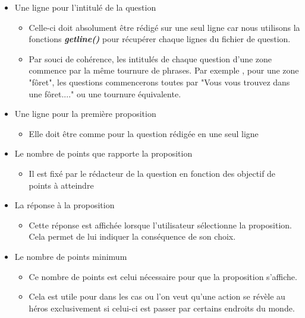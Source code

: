 \begin{itemize}

	\item Une ligne pour l'intitulé de la question
		  
		  \begin{itemize}
		  	\item Celle-ci doit absolument être rédigé sur une seul ligne car nous utilisons la fonctions 				      \textbf{\textit{getline()}} pour récupérer chaque lignes du fichier de question.
		  	
		  	\item Par souci de cohérence, les intitulés de chaque question d'une zone commence par la même     	                         tournure de phrases. Par exemple , pour une zone "fôret", les questions commencerons toutes  	                         par "Vous vous trouvez dans une fôret...." ou une tournure équivalente.
		  \end{itemize}
	
	\item Une ligne pour la première proposition
			
		  \begin{itemize}
		  	\item Elle doit être comme pour la question rédigée en une seul ligne
		  \end{itemize}
		  
	\item Le nombre de points que rapporte la proposition
			
		  \begin{itemize}
		  	\item Il est fixé par le rédacteur de la question en fonction des objectif de points à atteindre
		  \end{itemize}
	
	\item La réponse à la proposition
			
		  \begin{itemize}
		  	\item Cette réponse est affichée lorsque l'utilisateur sélectionne la proposition. Cela permet de lui 						  indiquer la conséquence de son choix.
		  \end{itemize}
	
	\item Le nombre de points minimum
			
		  \begin{itemize}
		  	\item Ce nombre de points est celui nécessaire pour que la proposition s'affiche. 
		  	\item Cela est utile pour dans les cas ou l'on veut qu'une action se révèle au héros exclusivement  si 					      celui-ci est passer par certains endroits du monde. 
		  \end{itemize}	
	

\end{itemize}
